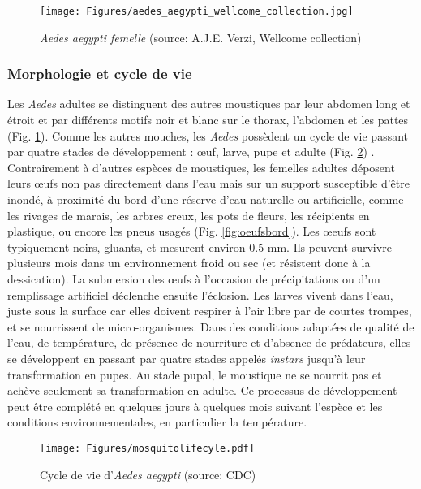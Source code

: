 \begin{figure}[t]
	\centering
	\texttt{[image: Figures/aedes\_aegypti\_wellcome\_collection.jpg]}
	\caption{{\em Aedes aegypti femelle} (source: A.J.E. Verzi, Wellcome collection)}
	\label{fig:aedesvexans}
\end{figure}

\subsubsection{Morphologie et cycle de vie}
Les {\em Aedes} adultes se distinguent des autres moustiques par leur abdomen long et étroit et par différents motifs noir et blanc sur le thorax, l'abdomen et les pattes (Fig. \ref{fig:aedesvexans}).
Comme les autres mouches, les {\em Aedes} possèdent un cycle de vie passant par quatre stades de développement : \oe uf, larve, pupe et adulte (Fig. \ref{fig:mosquitolifecyle}) \cite{christophers1960aedes}.
Contrairement à d'autres espèces de moustiques, les femelles adultes déposent leurs \oe ufs non pas directement dans l'eau mais sur un support susceptible d'être inondé, à proximité du bord d'une réserve d'eau naturelle ou artificielle, comme les rivages de marais, les arbres creux, les pots de fleurs, les récipients en plastique, ou encore les pneus usagés (Fig. \ref{fig:oeufsbord}).
Les \oe eufs sont typiquement noirs, gluants, et mesurent environ 0.5 mm.
Ils peuvent survivre plusieurs mois dans un environnement froid ou sec (et résistent donc à la dessication).
La submersion des \oe ufs à l'occasion de précipitations ou d'un remplissage artificiel déclenche ensuite l'éclosion.
Les larves vivent dans l'eau, juste sous la surface car elles doivent respirer à l'air libre par de courtes trompes, et se nourrissent de micro-organismes. 
Dans des conditions adaptées de qualité de l'eau, de température, de présence de nourriture et d'absence de prédateurs, elles se développent en passant par quatre stades appelés {\em instars} jusqu'à leur transformation en pupes.
Au stade pupal, le moustique ne se nourrit pas et achève seulement sa transformation en adulte.
Ce processus de développement peut être complété en quelques jours à quelques mois suivant l'espèce et les conditions environnementales, en particulier la température.


\begin{figure}[h]
	\centering
	\texttt{[image: Figures/mosquitolifecyle.pdf]}
	\caption{Cycle de vie d'{\em Aedes aegypti} (source: CDC)}
	\label{fig:mosquitolifecyle}
\end{figure}

